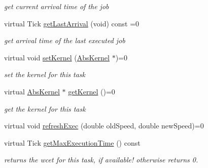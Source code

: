 \begin{DoxyCompactItemize}
\begin{DoxyCompactList}\small\item\em get current arrival time of the job \end{DoxyCompactList}\item 
virtual Tick \hyperlink{classRTSim_1_1AbsTask_ae8034fd96bf9f90d92de12dc15323f14}{get\+Last\+Arrival} (void) const =0\hypertarget{classRTSim_1_1AbsTask_ae8034fd96bf9f90d92de12dc15323f14}{}\label{classRTSim_1_1AbsTask_ae8034fd96bf9f90d92de12dc15323f14}

\begin{DoxyCompactList}\small\item\em get arrival time of the last executed job \end{DoxyCompactList}\item 
virtual void \hyperlink{classRTSim_1_1AbsTask_af51d90bc2ae75dfce356abd085c2e3ce}{set\+Kernel} (\hyperlink{classRTSim_1_1AbsKernel}{Abs\+Kernel} $\ast$)=0\hypertarget{classRTSim_1_1AbsTask_af51d90bc2ae75dfce356abd085c2e3ce}{}\label{classRTSim_1_1AbsTask_af51d90bc2ae75dfce356abd085c2e3ce}

\begin{DoxyCompactList}\small\item\em set the kernel for this task \end{DoxyCompactList}\item 
virtual \hyperlink{classRTSim_1_1AbsKernel}{Abs\+Kernel} $\ast$ \hyperlink{classRTSim_1_1AbsTask_a15624c399f3ebe58211cfccf96aafd28}{get\+Kernel} ()=0\hypertarget{classRTSim_1_1AbsTask_a15624c399f3ebe58211cfccf96aafd28}{}\label{classRTSim_1_1AbsTask_a15624c399f3ebe58211cfccf96aafd28}

\begin{DoxyCompactList}\small\item\em get the kernel for this task \end{DoxyCompactList}\item 
virtual void \hyperlink{classRTSim_1_1AbsTask_a6ab89d6cc6bfde8ad64ad0b41c4ca64f}{refresh\+Exec} (double old\+Speed, double new\+Speed)=0
\item 
virtual Tick \hyperlink{classRTSim_1_1AbsTask_a82ed35437ca8269dc5ca609c8ce72555}{get\+Max\+Execution\+Time} () const \hypertarget{classRTSim_1_1AbsTask_a82ed35437ca8269dc5ca609c8ce72555}{}\label{classRTSim_1_1AbsTask_a82ed35437ca8269dc5ca609c8ce72555}

\begin{DoxyCompactList}\small\item\em returns the wcet for this task, if available! otherwise returns 0. \end{DoxyCompactList}\end{DoxyCompactItemize}


